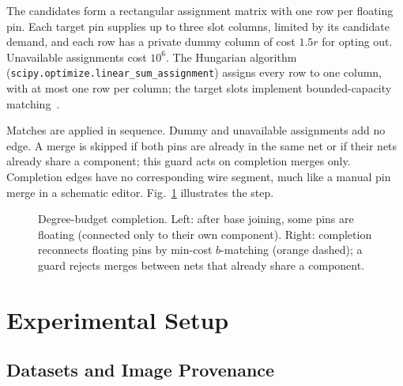 \documentclass[journal]{IEEEtran}
\begin{document}
The candidates form a rectangular assignment matrix with one row per floating pin. Each target pin supplies up to three slot columns, limited by its candidate demand, and each row has a private dummy column of cost $1.5r$ for opting out. Unavailable assignments cost $10^6$. The Hungarian algorithm~\cite{kuhn1955} (\texttt{scipy.optimize.linear\_sum\_assignment}) assigns every row to one column, with at most one row per column; the target slots implement bounded-capacity matching~\cite{schrijver2003combinatorial}.

Matches are applied in sequence. Dummy and unavailable assignments add no edge. A merge is skipped if both pins are already in the same net or if their nets already share a component; this guard acts on completion merges only. Completion edges have no corresponding wire segment, much like a manual pin merge in a schematic editor. Fig.~\ref{fig:completion} illustrates the step.

\begin{figure}[t]
\centering

\caption{Degree-budget completion. Left: after base joining, some pins are floating (connected only to their own component). Right: completion reconnects floating pins by min-cost $b$-matching (orange dashed); a guard rejects merges between nets that already share a component.}
\label{fig:completion}
\end{figure}

\section{Experimental Setup}
\label{sec:setup}

\subsection{Datasets and Image Provenance}
\end{document}
